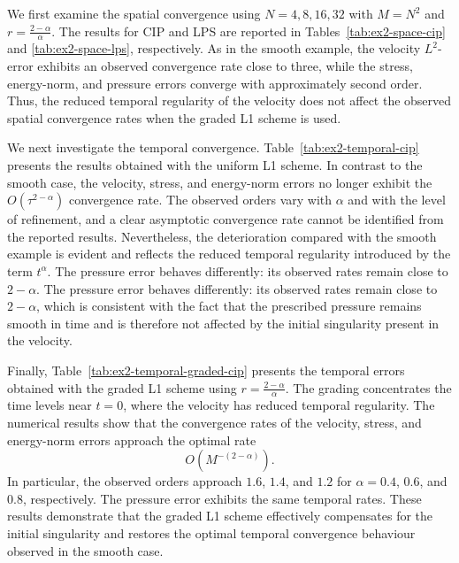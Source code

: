 \documentclass[11pt,a4paper]{article}
\numberwithin{equation}{section}
\theoremstyle{plain}
\theoremstyle{definition}
\theoremstyle{remark}
\begin{document}
We first examine the spatial convergence using
$N=4,8,16,32$ with $M=N^2$ and  $r=\frac{2-\alpha}{\alpha}$.
The results for CIP and LPS are reported in Tables~\ref{tab:ex2-space-cip} and \ref{tab:ex2-space-lps}, respectively. As in the smooth example, the velocity $L^2$-error exhibits an observed convergence rate close to three, while the stress, energy-norm, and pressure errors converge with approximately second order. Thus, the reduced temporal regularity of the velocity does not affect the observed spatial convergence rates when the graded L1 scheme is used.

We next investigate the temporal convergence. Table~\ref{tab:ex2-temporal-cip} presents the results obtained with the uniform L1 scheme. In contrast to the smooth case, the velocity, stress, and energy-norm errors no longer exhibit the $O(\tau^{2-\alpha})$ convergence rate. The observed orders vary with $\alpha$ and with the level of refinement, and a clear asymptotic convergence rate cannot be identified from the reported results. Nevertheless, the deterioration compared with the smooth example is evident and reflects the reduced temporal regularity introduced by the term $t^\alpha$. The pressure error behaves differently: its observed rates remain close to $2-\alpha$. The pressure error behaves differently: its observed rates remain close to $2-\alpha$, which is consistent with the fact that the prescribed pressure remains smooth in time and is therefore not affected by the initial singularity present in the velocity.

Finally, Table~\ref{tab:ex2-temporal-graded-cip} presents the temporal errors obtained with the graded L1 scheme using
$
r=\frac{2-\alpha}{\alpha}.
$
The grading concentrates the time levels near $t=0$, where the velocity has reduced temporal regularity. The numerical results show that the convergence rates of the velocity, stress, and energy-norm errors approach the optimal rate
\[
O(M^{-(2-\alpha)}).
\]
In particular, the observed orders approach $1.6$, $1.4$, and $1.2$ for $\alpha=0.4$, $0.6$, and $0.8$, respectively. The pressure error exhibits the same temporal rates. These results demonstrate that the graded L1 scheme effectively compensates for the initial singularity and restores the optimal temporal convergence behaviour observed in the smooth case.
\end{document}
